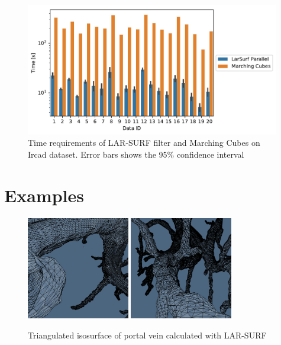 \documentclass[11pt, oneside]{amsart}   	%
\begin{document}
\begin{figure}
\centering
\includegraphics[width=0.99\textwidth]{figs/ircad_comparison.pdf} 
\caption{Time requirements of LAR-SURF filter and Marching Cubes on Ircad dataset. Error bars shows the 95\% confidence interval}
\label{fig:ircad_comparison}
\end{figure}



%
\section{Examples}\label{sec:examples}



\begin{figure}
\centering
\includegraphics[width=0.4\textwidth]{figs/porta_smoothing_1.png} 
\vspace{0.05\textwidth}
\includegraphics[width=0.4\textwidth]{figs/porta_smoothing_2.png} 
\caption{Triangulated isosurface of portal vein calculated with LAR-SURF}
\label{fig:example_porta}
\end{figure}
\end{document}
